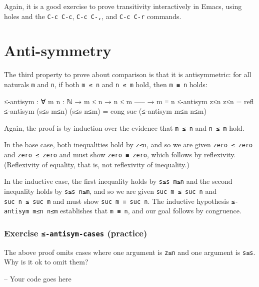 Again, it is a good exercise to prove transitivity interactively in
Emacs, using holes and the \texttt{C-c\ C-c}, \texttt{C-c\ C-,}, and
\texttt{C-c\ C-r} commands.

\hypertarget{anti-symmetry}{%
\section{Anti-symmetry}\label{anti-symmetry}}

The third property to prove about comparison is that it is
antisymmetric: for all naturals \texttt{m} and \texttt{n}, if both
\texttt{m\ ≤\ n} and \texttt{n\ ≤\ m} hold, then \texttt{m\ ≡\ n} holds:

\begin{fence}
\begin{code}
≤-antisym : ∀ {m n : ℕ}
  → m ≤ n
  → n ≤ m
    -----
  → m ≡ n
≤-antisym z≤n       z≤n        =  refl
≤-antisym (s≤s m≤n) (s≤s n≤m)  =  cong suc (≤-antisym m≤n n≤m)
\end{code}
\end{fence}

Again, the proof is by induction over the evidence that \texttt{m\ ≤\ n}
and \texttt{n\ ≤\ m} hold.

In the base case, both inequalities hold by \texttt{z≤n}, and so we are
given \texttt{zero\ ≤\ zero} and \texttt{zero\ ≤\ zero} and must show
\texttt{zero\ ≡\ zero}, which follows by reflexivity. (Reflexivity of
equality, that is, not reflexivity of inequality.)

In the inductive case, the first inequality holds by \texttt{s≤s\ m≤n}
and the second inequality holds by \texttt{s≤s\ n≤m}, and so we are
given \texttt{suc\ m\ ≤\ suc\ n} and \texttt{suc\ n\ ≤\ suc\ m} and must
show \texttt{suc\ m\ ≡\ suc\ n}. The inductive hypothesis
\texttt{≤-antisym\ m≤n\ n≤m} establishes that \texttt{m\ ≡\ n}, and our
goal follows by congruence.

\hypertarget{Relations-leq-antisym-cases}{%
\subsubsection{\texorpdfstring{Exercise \texttt{≤-antisym-cases}
(practice)}{Exercise ≤-antisym-cases (practice)}}\label{Relations-leq-antisym-cases}}

The above proof omits cases where one argument is \texttt{z≤n} and one
argument is \texttt{s≤s}. Why is it ok to omit them?

\begin{fence}
\begin{code}
-- Your code goes here
\end{code}
\end{fence}

